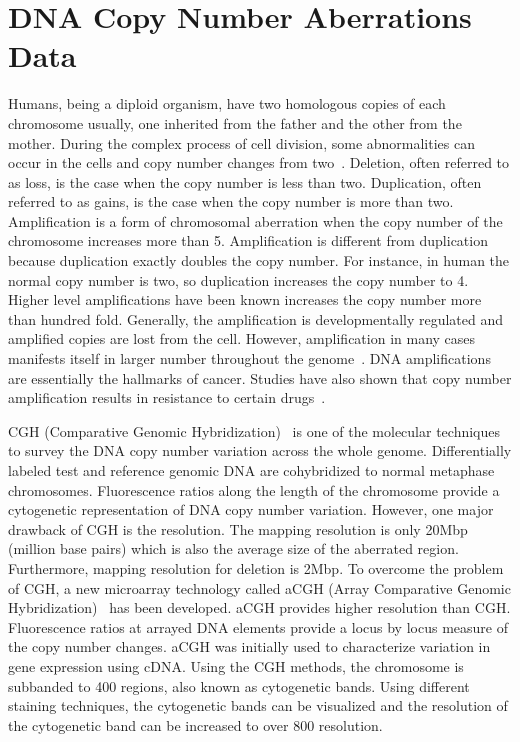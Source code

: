 \section{DNA Copy Number Aberrations Data}
\label{s:copynumberamp}
Humans, being a diploid organism, have two homologous copies of each chromosome usually, one inherited from the father and the other from the mother. During the complex process of cell division, some abnormalities can occur in the cells and copy number changes from two~\cite{aberrations}.  Deletion, often referred to as loss, is the case when the copy number is less than two. Duplication, often referred to as gains, is the case when the copy number is more than two. Amplification is a form of chromosomal aberration when the copy number of the chromosome increases more than 5. Amplification is different from duplication because duplication exactly doubles the copy number. For instance, in human the normal copy number is two, so duplication increases the copy number to 4. Higher level amplifications have been known increases the copy number more than hundred fold. Generally, the amplification is developmentally regulated and amplified copies are lost from the cell. However, amplification in many cases manifests itself in larger number throughout the genome~\cite{aberrations}. DNA amplifications are essentially the hallmarks of cancer. Studies have also shown that copy number amplification results in resistance to certain drugs~\cite{aberrations}. 

CGH (Comparative Genomic Hybridization)~\cite{cgh} is one of the molecular techniques to survey the DNA copy number variation across the whole genome. Differentially labeled test and reference genomic DNA are cohybridized to normal metaphase chromosomes. Fluorescence ratios along the length of the chromosome provide a cytogenetic representation of DNA copy number variation. However, one major drawback of CGH is the resolution. The mapping resolution is only 20Mbp (million base pairs) which is also the average size of the aberrated region. Furthermore, mapping resolution for deletion is 2Mbp. To overcome the problem of CGH, a new microarray technology called aCGH (Array Comparative Genomic Hybridization)~\cite{acgh} has been developed. aCGH provides higher resolution than CGH. Fluorescence ratios at arrayed DNA elements provide a locus by locus measure of the copy number changes. aCGH was initially used to characterize variation in gene expression using cDNA. Using the CGH methods, the chromosome is subbanded to 400 regions, also known as cytogenetic bands. Using different staining techniques, the cytogenetic bands can be visualized and the resolution of the cytogenetic band can be increased to over 800 resolution.

